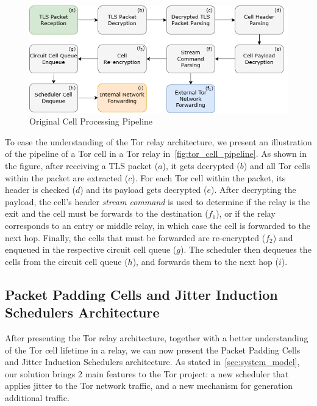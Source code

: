 \begin{figure}[!h]
  \centering
  \includegraphics[width=\textwidth]{Chapters/Figures/Tor_Cell_Pipeline.png}
  \caption{Original Cell Processing Pipeline}\label{fig:tor_cell_pipeline}
\end{figure}

To ease the understanding of the Tor relay architecture, we present an  illustration of the pipeline of a Tor cell in a Tor relay in~\autoref{fig:tor_cell_pipeline}. As shown in the figure, after receiving a TLS packet (\(a\)), it gets decrypted (\(b\)) and all Tor cells within the packet are extracted (\(c\)). For each Tor cell within the packet, its header is checked (\(d\))  and its payload gets decrypted (\(e\)). After decrypting the payload, the cell's header \textit{stream command} is used to determine if the relay is the exit and the cell must be forwards to the destination (\(f_1\)), or if the relay corresponds to an entry or middle relay, in which case the cell is forwarded to the next hop. Finally, the cells that must be forwarded are re-encrypted (\(f_2\)) and enqueued in the respective circuit cell queue (\(g\)). The scheduler then dequeues the cells from the circuit cell queue (\(h\)), and forwards them to the next hop (\(i\)).


\subsection{Packet Padding Cells and Jitter Induction Schedulers Architecture}\label{sec:ttt_architecture}

After presenting the Tor relay architecture, together with a better understanding of the Tor cell lifetime in a relay, we can now present the Packet Padding Cells and Jitter Induction Schedulers architecture. As stated in~\autoref{sec:system_model}, our solution brings 2 main features to the Tor project: a new scheduler that applies jitter to the Tor network traffic, and a new mechanism for generation additional traffic.

